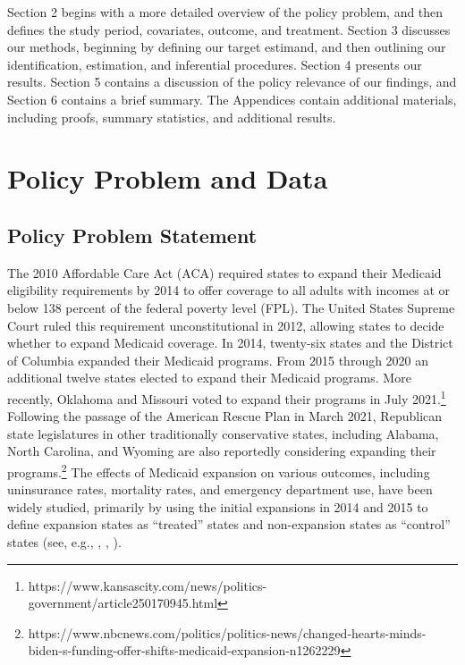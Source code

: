 \documentclass[aoas]{imsart}
\theoremstyle{plain}
\theoremstyle{remark}
\begin{document}
Section 2 begins with a more detailed overview of the policy problem, and then defines the study period, covariates, outcome, and treatment. Section 3 discusses our methods, beginning by defining our target estimand, and then outlining our identification, estimation, and inferential procedures. Section 4 presents our results. Section 5 contains a discussion of the policy relevance of our findings, and Section 6 contains a brief summary. The Appendices contain additional materials, including proofs, summary statistics, and additional results.

\section{Policy Problem and Data}

\subsection{Policy Problem Statement}

The 2010 Affordable Care Act (ACA) required states to expand their Medicaid eligibility requirements by 2014 to offer coverage to all adults with incomes at or below 138 percent of the federal poverty level (FPL). The United States Supreme Court ruled this requirement unconstitutional in 2012, allowing states to decide whether to expand Medicaid coverage. In 2014, twenty-six states and the District of Columbia expanded their Medicaid programs. From 2015 through 2020 an additional twelve states elected to expand their Medicaid programs. More recently, Oklahoma and Missouri voted to expand their programs in July 2021.\footnote{https://www.kansascity.com/news/politics-government/article250170945.html} Following the passage of the American Rescue Plan in March 2021, Republican state legislatures in other traditionally conservative states, including Alabama, North Carolina, and Wyoming are also reportedly considering expanding their programs.\footnote{https://www.nbcnews.com/politics/politics-news/changed-hearts-minds-biden-s-funding-offer-shifts-medicaid-expansion-n1262229} The effects of Medicaid expansion on various outcomes, including uninsurance rates, mortality rates, and emergency department use, have been widely studied, primarily by using the initial expansions in 2014 and 2015 to define expansion states as ``treated'' states and non-expansion states as ``control'' states (see, e.g., \cite{courtemanche2017early}, \cite{wherry2016early}, \cite{ladhania2021effect}).
\end{document}

